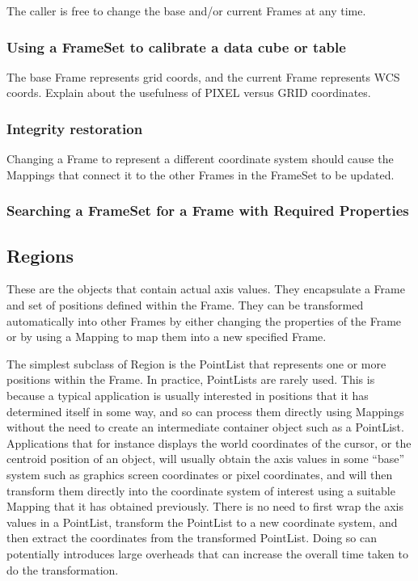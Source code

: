 \documentclass[final,authoryear,5p,times,twocolumn]{elsarticle}
\begin{document}
The caller is free to change the base and/or current Frames at any time.

\subsubsection{Using a FrameSet to calibrate a data cube or table}

The base Frame represents grid coords, and the current Frame
represents WCS coords.  Explain about the usefulness of PIXEL versus
GRID coordinates.

\subsubsection{Integrity restoration}

Changing a Frame to represent a different coordinate system should
cause the Mappings that connect it to the other Frames in the FrameSet
to be updated.

\subsubsection{Searching a FrameSet for a Frame with Required Properties}


\subsection{Regions}

These are the objects that contain actual axis values. They
encapsulate a Frame and set of positions defined within the
Frame. They can be transformed automatically into other Frames by
either changing the properties of the Frame or by using a Mapping to
map them into a new specified Frame.

The simplest subclass of Region is the PointList that represents one
or more positions within the Frame.  In practice, PointLists are
rarely used. This is because a typical application is usually
interested in positions that it has determined itself in some way, and
so can process them directly using Mappings without the need to create
an intermediate container object such as a PointList. Applications
that for instance displays the world coordinates of the cursor, or the
centroid position of an object, will usually obtain the axis values in
some ``base'' system such as graphics screen coordinates or pixel
coordinates, and will then transform them directly into the coordinate
system of interest using a suitable Mapping that it has obtained
previously. There is no need to first wrap the axis values in a
PointList, transform the PointList to a new coordinate system, and
then extract the coordinates from the transformed PointList. Doing so
can potentially introduces large overheads that can increase the
overall time taken to do the transformation.
\end{document}

